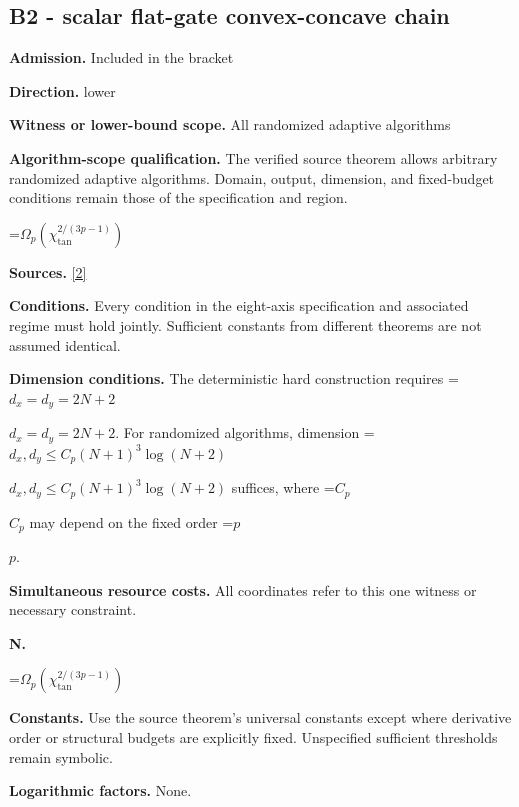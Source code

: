 \documentclass[10pt,a4paper]{article}
\newcommand{\AtlasMath}[1]{\par\begingroup\centering\setbox0=\hbox{$\displaystyle #1$}\ifdim\wd0>1.4\linewidth\typeout{ATLAS WIDE FORMULA: \the\wd0}\fi\ifdim\wd0>\linewidth\resizebox{\linewidth}{!}{\box0}\else\box0\fi\par\endgroup}
\newcommand{\AtlasInlineMath}[1]{\begingroup\setbox0=\hbox{$#1$}\ifdim\wd0>.4\linewidth\endgroup\AtlasMath{#1}\else\endgroup$#1$\fi}
\begin{document}
\subsection{B2 - scalar flat-gate convex-concave chain}


\textbf{Admission.} Included in the bracket



\textbf{Direction.} lower



\textbf{Witness or lower-bound scope.} All randomized adaptive algorithms



\textbf{Algorithm-scope qualification.} The verified source theorem allows arbitrary randomized adaptive algorithms. Domain, output, dimension, and fixed-budget conditions remain those of the specification and region.



\AtlasMath{\Omega_p(\chi_{\mathrm{tan}}^{2/(3p-1)})}


\textbf{Sources.} \href{https://arxiv.org/pdf/2609.28246v2}{[2]}



\textbf{Conditions.} Every condition in the eight-axis specification and associated regime must hold jointly. Sufficient constants from different theorems are not assumed identical.



\textbf{Dimension conditions.} The deterministic hard construction requires \AtlasInlineMath{d_x=d_y=2N+2}. For randomized algorithms, dimension \AtlasInlineMath{d_x,d_y\le C_p(N+1)^3\log(N+2)} suffices, where \AtlasInlineMath{C_p} may depend on the fixed order \AtlasInlineMath{p}.



\textbf{Simultaneous resource costs.} All coordinates refer to this one witness or necessary constraint.



\textbf{N.}



\AtlasMath{\Omega_p(\chi_{\mathrm{tan}}^{2/(3p-1)})}


\textbf{Constants.} Use the source theorem’s universal constants except where derivative order or structural budgets are explicitly fixed. Unspecified sufficient thresholds remain symbolic.



\textbf{Logarithmic factors.} None.
\end{document}
